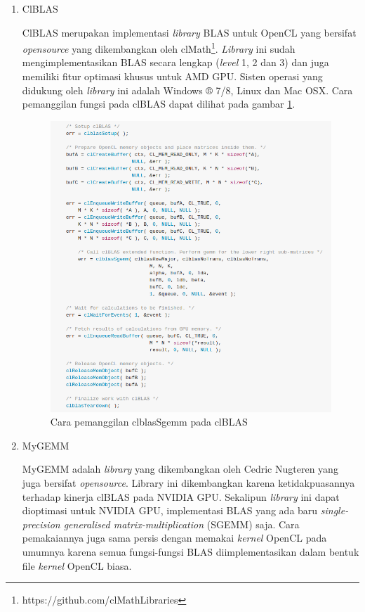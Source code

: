 \begin{enumerate}
	\item ClBLAS
	
	ClBLAS \cite{opencl.clblas} merupakan implementasi \textit{library} BLAS untuk OpenCL yang bersifat \textit{opensource} yang dikembangkan oleh clMath\footnote{https://github.com/clMathLibraries}. \textit{Library} ini sudah mengimplementasikan BLAS secara lengkap (\textit{level} 1, 2 dan 3) dan juga memiliki fitur optimasi khusus untuk AMD GPU. Sisten operasi yang didukung oleh \textit{library} ini adalah Windows ® 7/8​, Linux ​dan Mac OSX. Cara pemanggilan fungsi pada clBLAS dapat dilihat pada gambar \ref{fig:clblas_sgemm}.

	\begin{figure}
		\centering
		\includegraphics[width=1.0\textwidth]
		{pics/clblas_sgemm.png}
		\caption{Cara pemanggilan clblasSgemm pada clBLAS}
		\label{fig:clblas_sgemm}
	\end{figure}
	
	\item MyGEMM
	
	MyGEMM \cite{opencl.mygemm} adalah \textit{library} yang dikembangkan oleh Cedric Nugteren yang juga bersifat \textit{opensource}. Library ini dikembangkan karena ketidakpuasannya terhadap kinerja clBLAS \cite{opencl.clblas.tutorial} pada NVIDIA GPU. Sekalipun \textit{library} ini dapat dioptimasi untuk NVIDIA GPU, implementasi BLAS yang ada baru \textit{single-precision generalised matrix-multiplication} (SGEMM) saja. Cara pemakaiannya juga sama persis dengan memakai \textit{kernel} OpenCL pada umumnya karena semua fungsi-fungsi BLAS diimplementasikan dalam bentuk file \textit{kernel} OpenCL biasa.	
	
\end{enumerate}

